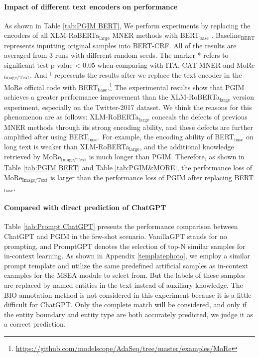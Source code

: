 \documentclass[11pt]{article}
\begin{document}
\paragraph{Impact of different text encoders on performance}
As shown in Table \ref{tab:PGIM BERT}, We perform experiments by replacing the encoders of all XLM-RoBERTa$_\text{large}$ \citep{conneau2019unsupervised} MNER methods with BERT$_\text{base}$ \citep{kenton2019bert}. Baseline$_{\text{BERT}}$ represents inputting original samples into BERT-CRF. All of the results are averaged from 3 runs with different random seeds. The marker * refers to significant test p-value < 0.05 when comparing with ITA, CAT-MNER and MoRe$_{\text{Image/Text}}$. And $^\ddag$ represents the results after we replace the text encoder in the MoRe official code with BERT$_\text{base}$.\footnote{\url{https://github.com/modelscope/AdaSeq/tree/master/examples/MoRe}} The experimental results show that PGIM achieves a greater performance improvement than the XLM-RoBERTa$_\text{large}$ version experiment, especially on the Twitter-2017 dataset. We think the reasons for this phenomenon are as follows: XLM-RoBERTa$_\text{large}$ conceals the defects of previous MNER methods through its strong encoding ability, and these defects are further amplified after using BERT$_\text{base}$. For example, the encoding ability of BERT$_\text{base}$ on long text is weaker than XLM-RoBERTa$_\text{large}$, and the additional knowledge retrieved by MoRe$_{\text{Image/Text}}$ is much longer than PGIM. Therefore, as shown in Table \ref{tab:PGIM BERT} and Table \ref{tab:PGIM&MORE}, the performance loss of MoRe$_{\text{Image/Text}}$ is larger than the performance loss of PGIM after replacing BERT$_\text{base}$. 

  
\paragraph{Compared with direct prediction of ChatGPT}
\label{ChatGPT direct prediction}
Table \ref{tab:Prompt ChatGPT} presents the performance comparison between ChatGPT and PGIM in the few-shot scenario. VanillaGPT stands for no prompting, and PromptGPT denotes the selection of top-N similar samples for in-context learning.
As shown in Appendix \ref{templatephoto}, we employ a similar prompt template and utilize the same predefined artificial samples as in-context examples for the MSEA module to select from. But the labels of these samples are replaced by named entities in the text instead of auxiliary knowledge. 
The BIO annotation method is not considered in this experiment because it is a little difficult for ChatGPT.
Only the complete match will be considered, and only if the entity boundary and entity type are both accurately predicted, we judge it as a correct prediction. 
\end{document}
